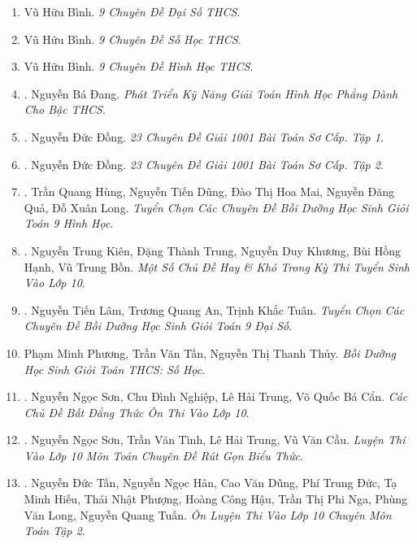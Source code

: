 \documentclass{article}
\begin{document}
\begin{enumerate}
	\item Vũ Hữu Bình. \textit{9 Chuyên Đề Đại Số THCS}.
	\item Vũ Hữu Bình. \textit{9 Chuyên Đề Số Học THCS}.
	\item Vũ Hữu Bình. \textit{9 Chuyên Đề Hình Học THCS}.
	\item \cite{Dang2018}. Nguyễn Bá Đang. \textit{Phát Triển Kỹ Năng Giải Toán Hình Học Phẳng Dành Cho Bậc THCS}.\hfill{\sf[reading]}
	\item \cite{Dong_23_1001_toan_I}. Nguyễn Đức Đồng. \textit{23 Chuyên Đề Giải 1001 Bài Toán Sơ Cấp. Tập 1}.\hfill{\sf[reading]}
	\item \cite{Dong_23_1001_toan_II}. Nguyễn Đức Đồng. \textit{23 Chuyên Đề Giải 1001 Bài Toán Sơ Cấp. Tập 2}.\hfill{\sf[reading]}
	\item \cite{Hung_Dung_Mai_Qua_Long_Toan_9_hinh_hoc}. Trần Quang Hùng, Nguyễn Tiến Dũng, Đào Thị Hoa Mai, Nguyễn Đăng Quả, Đỗ Xuân Long. \textit{Tuyển Chọn Các Chuyên Đề Bồi Dưỡng Học Sinh Giỏi Toán 9 Hình Học}.\hfill{\sf[reading]}
	\item \cite{Kien_Trung_Khuong_Hanh_Bon}. Nguyễn Trung Kiên, Đặng Thành Trung, Nguyễn Duy Khương, Bùi Hồng Hạnh, Vũ Trung Bồn. \textit{Một Số Chủ Đề Hay \& Khó Trong Kỳ Thi Tuyển Sinh Vào Lớp 10}.\hfill{\sf[reading]}
	\item \cite{Lam_An_Tuan_Toan_9_dai_so}. Nguyễn Tiến Lâm, Trương Quang An, Trịnh Khắc Tuân. \textit{Tuyển Chọn Các Chuyên Đề Bồi Dưỡng Học Sinh Giỏi Toán 9 Đại Số}.\hfill{\sf[reading]}
	\item Phạm Minh Phương, Trần Văn Tấn, Nguyễn Thị Thanh Thủy. \textit{Bồi Dưỡng Học Sinh Giỏi Toán THCS: Số Học}.
	\item \cite{Son_Nghiep_Trung_Can_bdt}. Nguyễn Ngọc Sơn, Chu Đình Nghiệp, Lê Hải Trung, Võ Quốc Bá Cẩn. \textit{Các Chủ Đề Bất Đẳng Thức Ôn Thi Vào Lớp 10}.\hfill{\sf[reading]}
	\item \cite{Son_Tinh_Trung_Cau_rgbt}. Nguyễn Ngọc Sơn, Trần Văn Tình, Lê Hải Trung, Vũ Văn Cầu. \textit{Luyện Thi Vào Lớp 10 Môn Toán Chuyên Đề Rút Gọn Biểu Thức}.\hfill{\sf[reading]}
	\item \cite{Tan_Han_Dung_Duc_Hieu_Phuong_Hau_Nga_Long_Tuan_tap_2}. Nguyễn Đức Tấn, Nguyễn Ngọc Hân, Cao Văn Dũng, Phí Trung Đức, Tạ Minh Hiếu, Thái Nhật Phượng, Hoàng Công Hậu, Trần Thị Phi Nga, Phùng Văn Long, Nguyễn Quang Tuấn. \textit{Ôn Luyện Thi Vào Lớp 10 Chuyên Môn Toán Tập 2}.\\\mbox{}\hfill{\sf[reading]}
\end{enumerate}
\end{document}
